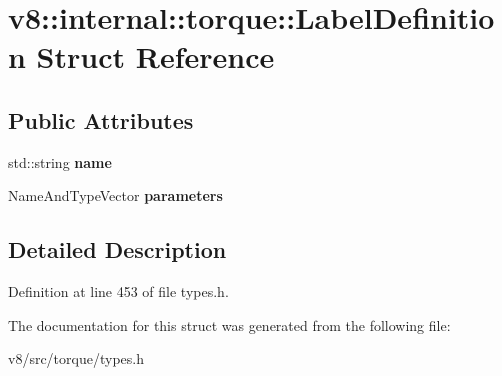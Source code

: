 \hypertarget{structv8_1_1internal_1_1torque_1_1LabelDefinition}{}\section{v8\+:\+:internal\+:\+:torque\+:\+:Label\+Definition Struct Reference}
\label{structv8_1_1internal_1_1torque_1_1LabelDefinition}
\subsection*{Public Attributes}
\begin{DoxyCompactItemize}
\item 
\mbox{\label{structv8_1_1internal_1_1torque_1_1LabelDefinition_a5ebee4c5594350ff069ee4922ba49648}} 
std\+::string {\bfseries name}
\item 
\mbox{\label{structv8_1_1internal_1_1torque_1_1LabelDefinition_a3f9e27048bdb42e95d368b27128d4c4a}} 
Name\+And\+Type\+Vector {\bfseries parameters}
\end{DoxyCompactItemize}


\subsection{Detailed Description}


Definition at line 453 of file types.\+h.



The documentation for this struct was generated from the following file\+:\begin{DoxyCompactItemize}
\item 
v8/src/torque/types.\+h\end{DoxyCompactItemize}
